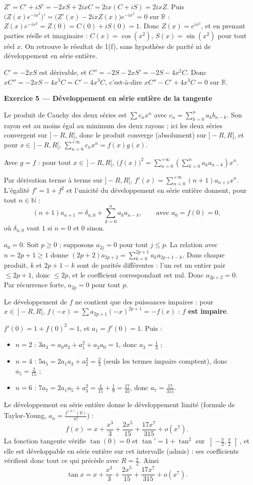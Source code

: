 \documentclass[a4paper,11pt]{article}
\numberwithin{equation}{section}
\numberwithin{figure}{section}
\numberwithin{table}{section}
\theoremstyle{enonce}
\theoremstyle{exemple}
\theoremstyle{remarque}
\newcommand{\R}{\mathbb{R}}
\newcommand{\N}{\mathbb{N}}
\newcommand{\Partie}[1]{\par\needspace{5\baselineskip}\vspace{1.1em}\noindent
  {\sffamily\bfseries\large\color{Bleu}#1}\par\vspace{2pt}{\color{Filet}\rule{\linewidth}{0.4pt}}\par\smallskip}
\newcommand{\Q}[1]{\par\needspace{3\baselineskip}\medskip\noindent{\sffamily\bfseries\color{Bleu}#1}\enspace}
\begin{document}
\Q{3.(b)} $Z'=C'+iS'=-2xS+2ixC=2ix(C+iS)=2ixZ$. Puis
$\big(Z(x)e^{-ix^2}\big)'=\big(Z'(x)-2ixZ(x)\big)e^{-ix^2}=0$ sur $\R$ : $Z(x)e^{-ix^2}=Z(0)=C(0)+iS(0)=1$. Donc $Z(x)=e^{ix^2}$, et en prenant parties
réelle et imaginaire : $C(x)=\cos(x^2)$, $S(x)=\sin(x^2)$ pour tout réel $x$. On retrouve le résultat de 1(f), sans hypothèse de parité ni de
développement en série entière.

\Q{3.(c)} $C'=-2xS$ est dérivable, et $C''=-2S-2xS'=-2S-4x^2C$. Donc $xC''=-2xS-4x^3C=C'-4x^3C$, c'est-à-dire
$xC''-C'+4x^3C=0$ sur $\R$.

\Partie{Exercice 5 — Développement en série entière de la tangente}

\Q{1.(a)} Le produit de Cauchy des deux séries est $\sum c_nx^n$ avec $c_n=\sum_{k=0}^na_kb_{n-k}$. Son rayon est au moins égal au minimum des
deux rayons ; ici les deux séries convergent sur $]-R,R[$, donc le produit converge (absolument) sur $]-R,R[$, et pour $x\in\,]-R,R[$,
$\sum_{n=0}^{+\infty}c_nx^n=f(x)g(x)$.

\Q{1.(b)} Avec $g=f$ : pour tout $x\in\,]-R,R[$, $\big(f(x)\big)^2=\sum_{n=0}^{+\infty}\left(\sum_{k=0}^na_ka_{n-k}\right)x^n$.

\Q{2.(a)} Par dérivation terme à terme sur $]-R,R[$, $f'(x)=\sum_{n=0}^{+\infty}(n+1)a_{n+1}x^n$. L'égalité $f'=1+f^2$ et l'unicité du développement
en série entière donnent, pour tout $n\in\N$ :
\[(n+1)a_{n+1}=\delta_{n,0}+\sum_{k=0}^na_ka_{n-k},\qquad\text{avec }a_0=f(0)=0,\]
où $\delta_{n,0}$ vaut $1$ si $n=0$ et $0$ sinon.

\Q{2.(b)} $a_0=0$. Soit $p\geq0$ ; supposons $a_{2j}=0$ pour tout $j\leq p$. La relation avec $n=2p+1\geq1$ donne
$(2p+2)a_{2p+2}=\sum_{k=0}^{2p+1}a_ka_{2p+1-k}$. Dans chaque produit, $k$ et $2p+1-k$ sont de parités différentes : l'un est un entier pair
$\leq2p+1$, donc $\leq2p$, et le coefficient correspondant est nul. Donc $a_{2p+2}=0$. Par récurrence forte, $a_{2p}=0$ pour tout $p$.

Le développement de $f$ ne contient que des puissances impaires : pour $x\in\,]-R,R[$, $f(-x)=\sum a_{2p+1}(-x)^{2p+1}=-f(x)$ : \textbf{$f$ est impaire}.

\Q{2.(c)} $f'(0)=1+f(0)^2=1$, et $a_1=f'(0)=1$. Puis :
\begin{itemize}[leftmargin=1.2em,itemsep=2pt]
\item $n=2$ : $3a_3=a_0a_2+a_1^2+a_2a_0=1$, donc $a_3=\frac13$ ;
\item $n=4$ : $5a_5=2a_1a_3+a_2^2=\frac23$ (seuls les termes impairs comptent), donc $a_5=\frac2{15}$ ;
\item $n=6$ : $7a_7=2a_1a_5+a_3^2=\frac4{15}+\frac19=\frac{17}{45}$, donc $a_7=\frac{17}{315}$.
\end{itemize}

\Q{2.(d)} Le développement en série entière donne le développement limité (formule de Taylor-Young, $a_n=\frac{f^{(n)}(0)}{n!}$) :
\[f(x)=x+\frac{x^3}3+\frac{2x^5}{15}+\frac{17x^7}{315}+o(x^7).\]
La fonction tangente vérifie $\tan(0)=0$ et $\tan'=1+\tan^2$ sur $\left]-\frac\pi2,\frac\pi2\right[$, et elle est développable en série entière sur cet
intervalle (admis) : ses coefficients vérifient donc tout ce qui précède avec $R=\frac\pi2$. Ainsi
\[\tan x=x+\frac{x^3}3+\frac{2x^5}{15}+\frac{17x^7}{315}+o(x^7).\]
\end{document}
